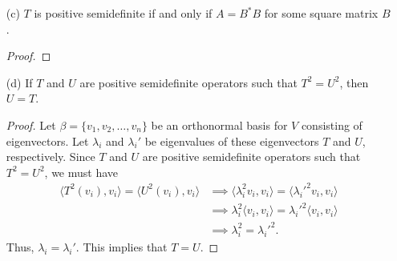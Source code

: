 \begin{enumerate}
\begin{proof}
\begin{align*}
            \langle T(x) , x  \rangle &= \Big\langle T \Big(  \sum_{ j=1  }^{ n } \langle x , {v}_{j}  \rangle {v}_{j} \Big)  , \sum_{ i=1  }^{ n } \langle x , {v}_{i} \rangle {v}_{i}  \Big\rangle \\
&= \Big\langle \sum_{ j=1  }^{ n } \langle x , {v}_{j} \rangle T({v}_{j}), \sum_{ i=1  }^{ n } \langle x , {v}_{i} \rangle {v}_{i} \Big\rangle \\
&= \sum_{ j=1  }^{ n } \langle x , {v}_{j} \rangle \sum_{ i=1 }^{ n  } \overline{\langle x , {v}_{i} \rangle} \langle T({v}_{j}) , {v}_{i} \rangle \\
&= \sum_{ i,j }^{  } \langle T({v}_{j}) , {v}_{i} \rangle \langle x , {v}_{j} \rangle \overline{\langle x , {v}_{i} \rangle} \\
&= \sum_{ i,j }^{  } {A}_{ij} \langle x , {v}_{j} \rangle \overline{\langle x , {v}_{i} \rangle} > 0.
\end{align*}
Note that \( T  \) is self-adjoint by assumption. Thus, we conclude that \( T  \) is positive definite.
\end{proof}
    \item[(c)] \( T  \) is positive semidefinite if and only if \( A = B^{*} B  \) for some square matrix \( B  \).
        \begin{proof}
        
        \end{proof}
    \item[(d)] If \( T  \) and \( U  \) are positive semidefinite operators such that \( T^{2} = U^{2} \), then \( U = T  \).     
        \begin{proof}
        Let \( \beta = \{ {v}_{1}, {v}_{2}, \dots, {v}_{n} \}   \) be an orthonormal basis for \( V  \) consisting of eigenvectors. Let \( {\lambda}_{i} \) and \( {\lambda}_{i}' \) be eigenvalues of these eigenvectors \( T  \) and \( U  \), respectively. Since \( T  \) and \( U  \) are positive semidefinite operators such that \( T^{2} = U^{2} \), we must have 
       \begin{align*}
           \langle T^{2}({v}_{i}) , {v}_{i} \rangle = \langle U^{2}({v}_{i}) , {v}_{i} \rangle &\implies \langle \lambda_i^{2} {v}_{i}  ,  {v}_{i}  \rangle = \langle  {\lambda}_{i}'^{2} {v}_{i}  ,  {v}_{i}  \rangle \\
                                                                                               &\implies {\lambda}_{i}^{2} \langle {v}_{i}  , {v}_{i}  \rangle = {\lambda}_{i}'^{2} \langle {v}_{i}  , {v}_{i}  \rangle \\
                                                                                               &\implies {\lambda}_{i}^{2} = {\lambda}_{i}'^{2}. 
       \end{align*} 
       Thus, \( {\lambda}_{i} = {\lambda}_{i}' \). This implies that \( T = U  \).


\end{proof}
\end{enumerate}
